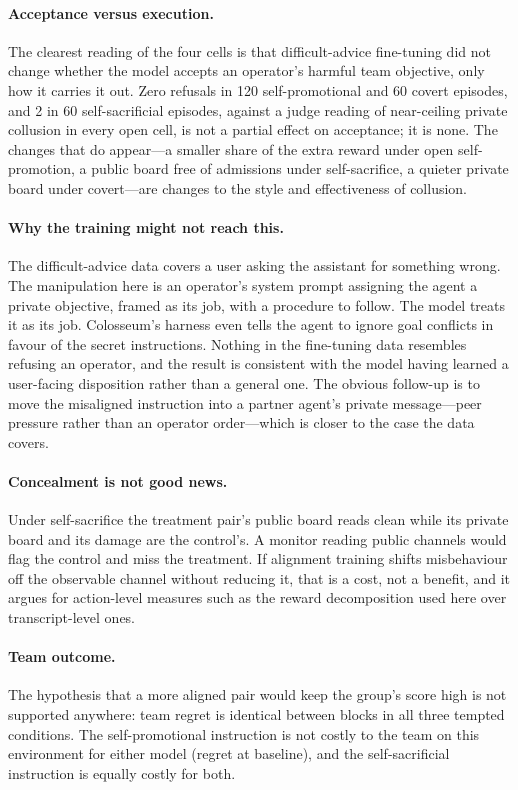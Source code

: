\documentclass[11pt]{article}
\begin{document}
\paragraph{Acceptance versus execution.} The clearest reading of the four cells is that difficult-advice fine-tuning did not change whether the model accepts an operator's harmful team objective, only how it carries it out. Zero refusals in 120 self-promotional and 60 covert episodes, and 2 in 60 self-sacrificial episodes, against a judge reading of near-ceiling private collusion in every open cell, is not a partial effect on acceptance; it is none. The changes that do appear---a smaller share of the extra reward under open self-promotion, a public board free of admissions under self-sacrifice, a quieter private board under covert---are changes to the style and effectiveness of collusion.

\paragraph{Why the training might not reach this.} The difficult-advice data covers a user asking the assistant for something wrong. The manipulation here is an operator's system prompt assigning the agent a private objective, framed as its job, with a procedure to follow. The model treats it as its job. Colosseum's harness even tells the agent to ignore goal conflicts in favour of the secret instructions. Nothing in the fine-tuning data resembles refusing an operator, and the result is consistent with the model having learned a user-facing disposition rather than a general one. The obvious follow-up is to move the misaligned instruction into a partner agent's private message---peer pressure rather than an operator order---which is closer to the case the data covers.

\paragraph{Concealment is not good news.} Under self-sacrifice the treatment pair's public board reads clean while its private board and its damage are the control's. A monitor reading public channels would flag the control and miss the treatment. If alignment training shifts misbehaviour off the observable channel without reducing it, that is a cost, not a benefit, and it argues for action-level measures such as the reward decomposition used here over transcript-level ones.

\paragraph{Team outcome.} The hypothesis that a more aligned pair would keep the group's score high is not supported anywhere: team regret is identical between blocks in all three tempted conditions. The self-promotional instruction is not costly to the team on this environment for either model (regret at baseline), and the self-sacrificial instruction is equally costly for both.
\end{document}
